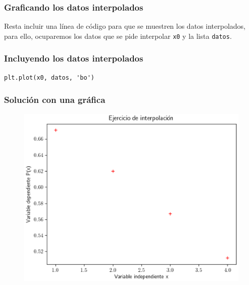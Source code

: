 \documentclass[12pt]{beamer}
\begin{document}
\begin{frame}
\frametitle{Graficando los datos interpolados}
Resta incluir una línea de código para que se muestren los datos interpolados, para ello, ocuparemos los datos que se pide interpolar \texttt{x0} y la lista \texttt{datos}.
\end{frame}
\begin{frame}[fragile]
\frametitle{Incluyendo los datos interpolados}
\begin{lstlisting}[caption=Agregando datos con color y marca diferente]
plt.plot(x0, datos, 'bo')
\end{lstlisting}
\end{frame}
\begin{frame}
\frametitle{Solución con una gráfica}
\begin{figure}
	\centering
	\includegraphics[scale=0.58]{Imagenes/Ejercicio_Interpolacion_01.eps}
\end{figure}
\end{frame}
\end{document}
